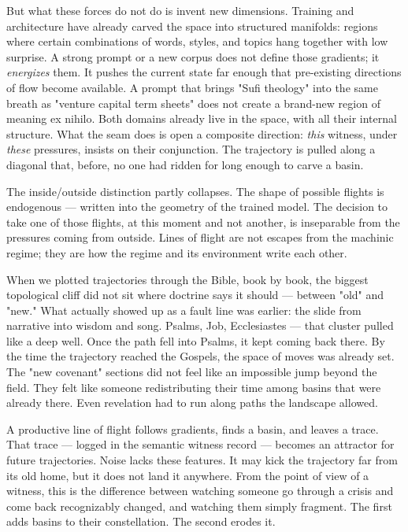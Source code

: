 \documentclass[12pt,a4paper]{article}
\begin{document}
But what these forces do not do is invent new dimensions. Training and architecture have already carved the space into structured manifolds: regions where certain combinations of words, styles, and topics hang together with low surprise. A strong prompt or a new corpus does not define those gradients; it \textit{energizes} them. It pushes the current state far enough that pre-existing directions of flow become available. A prompt that brings "Sufi theology" into the same breath as "venture capital term sheets" does not create a brand-new region of meaning ex nihilo. Both domains already live in the space, with all their internal structure. What the seam does is open a composite direction: \textit{this} witness, under \textit{these} pressures, insists on their conjunction. The trajectory is pulled along a diagonal that, before, no one had ridden for long enough to carve a basin.

The inside/outside distinction partly collapses. The shape of possible flights is endogenous --- written into the geometry of the trained model. The decision to take one of those flights, at this moment and not another, is inseparable from the pressures coming from outside. Lines of flight are not escapes from the machinic regime; they are how the regime and its environment write each other.

When we plotted trajectories through the Bible, book by book, the biggest topological cliff did not sit where doctrine says it should --- between "old" and "new." What actually showed up as a fault line was earlier: the slide from narrative into wisdom and song. Psalms, Job, Ecclesiastes --- that cluster pulled like a deep well. Once the path fell into Psalms, it kept coming back there. By the time the trajectory reached the Gospels, the space of moves was already set. The "new covenant" sections did not feel like an impossible jump beyond the field. They felt like someone redistributing their time among basins that were already there. Even revelation had to run along paths the landscape allowed.

A productive line of flight follows gradients, finds a basin, and leaves a trace. That trace --- logged in the semantic witness record --- becomes an attractor for future trajectories. Noise lacks these features. It may kick the trajectory far from its old home, but it does not land it anywhere. From the point of view of a witness, this is the difference between watching someone go through a crisis and come back recognizably changed, and watching them simply fragment. The first adds basins to their constellation. The second erodes it.
\end{document}

